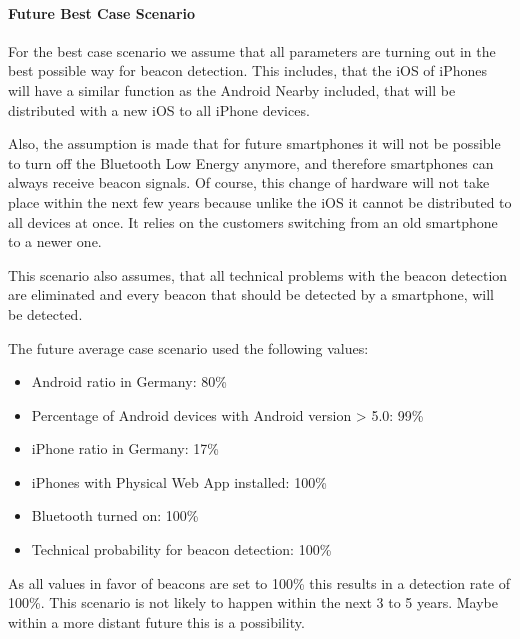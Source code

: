 \paragraph{Future Best Case Scenario}

For the best case scenario we assume that all parameters are turning out in the best possible way for beacon detection. This includes, that the iOS of iPhones will have a similar function as the Android Nearby included, that will be distributed with a new iOS to all iPhone devices. 
\par Also, the assumption is made that for future smartphones it will not be possible to turn off the Bluetooth Low Energy anymore, and therefore smartphones can always receive beacon signals. Of course, this change of hardware will not take place within the next few years because unlike the iOS it cannot be distributed to all devices at once. It relies on the customers switching from an old smartphone to a newer one.
\par This scenario also assumes, that all technical problems with the beacon detection are eliminated and every beacon that should be detected by a smartphone, will be detected.


The future average case scenario used the following values:
\begin{itemize}
\item Android ratio in Germany: 80\%
\item Percentage of Android devices with Android version > 5.0: 99\%
\item iPhone ratio in Germany: 17\%
\item iPhones with Physical Web App installed: 100\%
\item Bluetooth turned on: 100\%
\item Technical probability for beacon detection: 100\%
\end{itemize}

As all values in favor of beacons are set to 100\% this results in a detection rate of 100\%. This scenario is not likely to happen within the next 3 to 5 years. Maybe within a more distant future this is a possibility.
